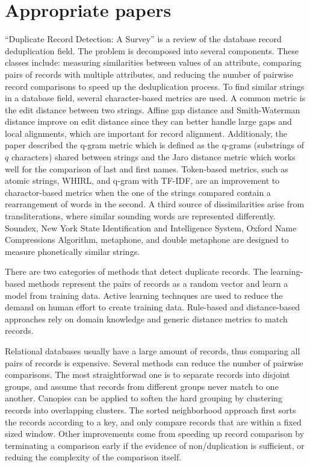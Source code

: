 \documentclass[]{article}
\begin{document}
\section{Appropriate papers} %
\label{sec:appropriate_papers}
``Duplicate Record Detection: A Survey'' is a review of the database record deduplication field.  The problem is decomposed into several components. These classes include: measuring similarities between values of an attribute, comparing pairs of records with multiple attributes, and reducing the number of pairwise record comparisons to speed up the deduplication process.  To find similar strings in a database field, several character-based metrics are used.  A common metric is the edit distance between two strings.  Affine gap distance and Smith-Waterman distance improve on edit distance since they can better handle large gaps and local alignments, which are important for record alignment.  Additionaly, the paper described the q-gram metric which is defined as the q-grams (substrings of $q$ characters) shared between strings and the Jaro distance metric which works well for the comparison of last and first names.  Token-based metrics, such as atomic strings, WHIRL, and q-gram with TF-IDF, are an improvement to charactor-based metrics when the one of the strings compared contain a rearrangement of words in the second.  A third source of dissimilarities arise from transliterations, where similar sounding words are represented differently.  Soundex, New York State Identification and Intelligence System, Oxford Name Compressions Algorithm, metaphone, and double metaphone are designed to measure phonetically similar strings.  

There are two categories of methods that detect duplicate records.
The learning-based methods represent the pairs of records as a random vector and learn a model from training data.
Active learning technques are used to reduce the demand on human effort to create training data.  Rule-based and distance-based approaches rely on domain knowledge and generic distance metrics to match records.

Relational databases usually have a large amount of records, thus comparing all pairs of records is expensive.  Several methods can reduce the number of pairwise comparisons.  The most straightforwad one is to separate records into disjoint groups, and assume that records from different groups never match to one another.  Canopies can be applied to soften the hard grouping by clustering records into overlapping clusters.  The sorted neighborhood approach first sorts the records according to a key, and only compare records that are within a fixed sized window.  Other improvements come from speeding up record comparison by terminating a comparison early if the evidence of non/duplication is sufficient, or reduing the complexity of the comparison itself.
\end{document}
